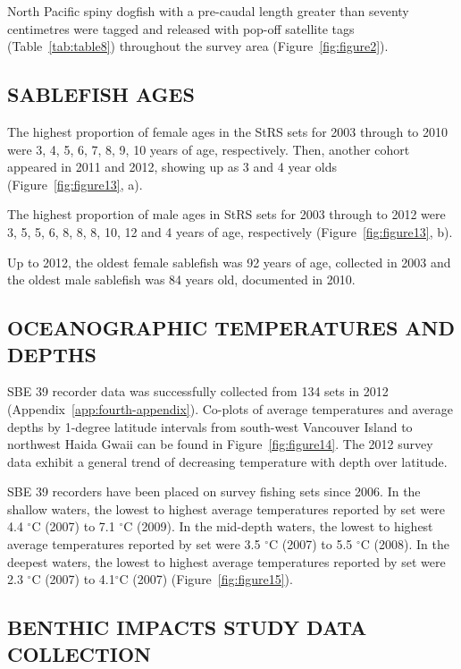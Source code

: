 \documentclass[12pt]{article}\usepackage[]{graphicx}\usepackage[]{color}
\begin{document}
North Pacific spiny dogfish with a pre-caudal length greater than seventy centimetres were tagged and released with pop-off satellite tags (Table~\ref{tab:table8}) throughout the survey area (Figure~\ref{fig:figure2}).

\hypertarget{sablefish-ages}{%
\subsection{SABLEFISH AGES}\label{sablefish-ages}}

The highest proportion of female ages in the StRS sets for 2003 through to 2010 were 3, 4, 5, 6, 7, 8, 9, 10 years of age, respectively. Then, another cohort appeared in 2011 and 2012, showing up as 3 and 4 year olds (Figure~\ref{fig:figure13}, a).

The highest proportion of male ages in StRS sets for 2003 through to 2012 were 3, 5, 5, 6, 8, 8, 8, 10, 12 and 4 years of age, respectively (Figure~\ref{fig:figure13}, b).

Up to 2012, the oldest female sablefish was 92 years of age, collected in 2003 and the oldest male sablefish was 84 years old, documented in 2010.

\hypertarget{oceanographic-temperatures-and-depths}{%
\subsection{OCEANOGRAPHIC TEMPERATURES AND DEPTHS}\label{oceanographic-temperatures-and-depths}}

SBE 39 recorder data was successfully collected from 134 sets in 2012 (Appendix~\ref{app:fourth-appendix}). Co-plots of average temperatures and average depths by 1-degree latitude intervals from south-west Vancouver Island to northwest Haida Gwaii can be found in Figure~\ref{fig:figure14}. The 2012 survey data exhibit a general trend of decreasing temperature with depth over latitude.

SBE 39 recorders have been placed on survey fishing sets since 2006. In the shallow waters, the lowest to highest average temperatures reported by set were 4.4 \(^\circ\)C (2007) to 7.1 \(^\circ\)C (2009). In the mid-depth waters, the lowest to highest average temperatures reported by set were 3.5 \(^\circ\)C (2007) to 5.5 \(^\circ\)C (2008). In the deepest waters, the lowest to highest average temperatures reported by set were 2.3 \(^\circ\)C (2007) to 4.1\(^\circ\)C (2007) (Figure~\ref{fig:figure15}).

\hypertarget{benthic-impacts-study-data-collection}{%
\subsection{BENTHIC IMPACTS STUDY DATA COLLECTION}\label{benthic-impacts-study-data-collection}}
\end{document}
